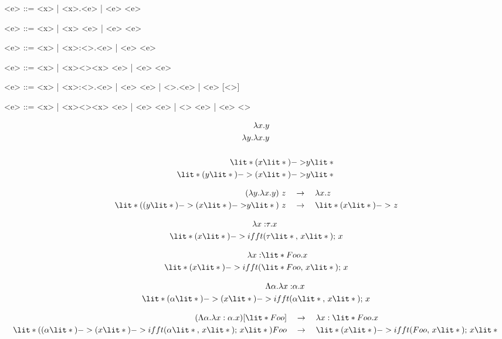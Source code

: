 \documentclass[11hpt]{article}
\begin{document}
\begin{grammar}
  <e> ::= <x> | <\lambda x>.<e> | <e> <e>
\end{grammar}

\begin{grammar}
  <e> ::= <x> | \lit*{(}<x>\lit*{) ->} <e> | <e> <e>
\end{grammar}

\begin{grammar}
  <e> ::= <x> | <\lambda x>:<\tau>.<e> | <e> <e>
\end{grammar}

\begin{grammar}
  <e> ::= <x> | \lit*{(}<x><\tau>\lit*{,}<x>\lit*{);} <e> | <e> <e>
\end{grammar}

\begin{grammar}
  <e> ::= <x> | <\lambda x>:<\tau>.<e> | <e> <e> | <\Lambda \alpha>.<e> | <e> [<\tau>]
\end{grammar}

\begin{grammar}
  <e> ::= <x>
       | \lit*{(}<x><\tau>\lit*{,}<x>\lit*{);} <e>
       | <e> <e>
       | \lit*{(}<\alpha>\lit*{) ->} <e>
       | <e> <\tau>
\end{grammar}

\begin{align*}
\lambda &x.y \\
\lambda y.\lambda &x.y \\ \\
\lit*{(}&x\lit*{) -> }y\lit*{} \\
\lit*{(}y\lit*{) -> (}&x\lit*{) -> }y\lit*{}
\end{align*}

\begin{align*}
(\lambda y.\lambda x.y) \ z \quad &\to \quad \lambda x.z\\
\lit*{((}y\lit*{) -> (}x\lit*{) -> }y\lit*{)}\ z \quad &\to \quad \lit*{(}x\lit*{) ->}\ z
\end{align*}

 \begin{align*}
\lambda x:&\tau.x \\
\lit*{(}x\lit*{) -> ifft(}&\tau\lit*{,\ }x\lit*{);}\ x
\end{align*}

 \begin{align*}
\lambda x:&\lit*{Foo}.x \\
\lit*{(}x\lit*{) -> ifft(}&\lit*{Foo,\ }x\lit*{);}\ x
\end{align*}

\begin{align*}
\Lambda \alpha.\lambda x:&\alpha.x \\
\lit*{(} \alpha\lit*{) -> (}x\lit*{) -> ifft(} &\alpha \lit*{,\ }x\lit*{);}\ x
\end{align*}

\begin{align*}
(\Lambda\alpha.\lambda x:\alpha.x) [\lit*{Foo}] \quad &\to \quad \lambda x:\lit*{Foo}.x \\
\lit*{((}\alpha\lit*{) -> (}x\lit*{) -> ifft(} \alpha \lit*{,\ }x\lit*{); \ }x\lit*{) Foo} \quad &\to \quad \lit*{(}x\lit*{) -> ifft(Foo,\ }x\lit*{); \ }x\lit*{}
\end{align*}
\end{document}
